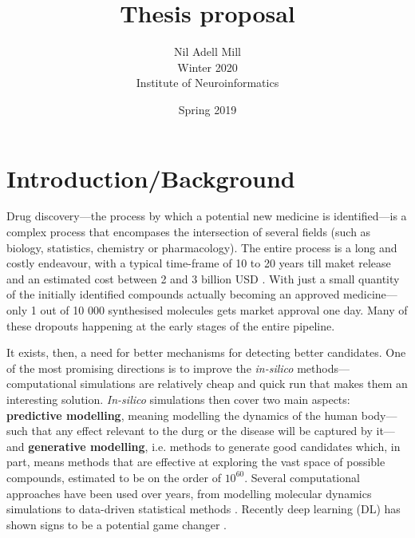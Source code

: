 \documentclass{article}
\begin{document}
\title{\Large Thesis proposal}
\author{Nil Adell Mill \\
        Winter 2020 \\
        Institute of Neuroinformatics \\}
\date{Spring 2019}

\maketitle

    \section*{Introduction/Background}  

Drug discovery—the process by which a potential new medicine is identified---is a
 complex process that encompases the intersection of several fields (such as biology,
 statistics, chemistry or pharmacology). The entire process is a long and costly
 endeavour, with a typical time-frame of 10 to 20 years till maket release and an
 estimated cost between 2 and 3 billion USD \cite{Schneider2019, Scannell2012}. With
 just a small quantity of the initially identified compounds actually becoming an
 approved medicine—only 1 out of 10 000 synthesised molecules gets market approval one
 day. Many of these dropouts happening at the early stages of the entire pipeline.

It exists, then, a need for better mechanisms for detecting better candidates. One of
 the most promising directions is to improve the \emph{in-silico}
 methods---computational simulations are relatively cheap and quick run that makes them
 an interesting solution. \emph{In-silico} simulations then cover two main aspects:
 \textbf{predictive modelling}, meaning modelling the dynamics of the human body---such
 that any effect relevant to the durg or the disease will be captured by it---and
 \textbf{generative modelling}, i.e. methods to generate good candidates which, in part,
 means methods that are effective at exploring the vast space of possible compounds,
 estimated to be on the order of $10^{60}$\cite{Reymond2012}.
 Several computational approaches have been used over years, from modelling molecular
 dynamics simulations to data-driven statistical methods \cite{Hung2014, Kuhn2016}.
 Recently deep learning (DL) has shown signs to be a potential game changer
 \cite{Dargan2019}. 


\end{document}
